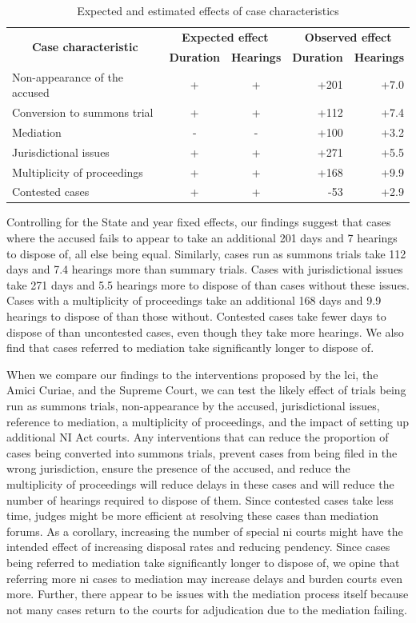 \documentclass[12pt,a4paper]{article}
\begin{document}
\begin{table}[!ht]
\caption{Expected and estimated effects of case characteristics}
\label{tab:observed}
\centering
\footnotesize
\begin{tabular}{lcc|rr}
\toprule
\multicolumn{1}{c}{\multirow{2}{*}{\textbf{Case characteristic}}} & \multicolumn{2}{c}{\textbf{Expected effect}} & \multicolumn{2}{c}{\textbf{Observed effect}} \\ \cmidrule(l){2-5}
\multicolumn{1}{c}{} & \textbf{Duration} & \textbf{Hearings} & \textbf{Duration} & \textbf{Hearings}\\ \midrule
Non-appearance of the accused & + & + & +201 & +7.0 \\
Conversion to summons trial & + & + & +112 & +7.4\\
Mediation & - & - & +100 & +3.2 \\
Jurisdictional issues & + & + & +271 & +5.5 \\
Multiplicity of proceedings & + & + & +168 & +9.9\\
Contested cases & + & + & -53 & +2.9\\ \bottomrule
\end{tabular}
\end{table}

Controlling for the State and year fixed effects, our findings suggest that cases where the accused fails to appear to take an additional 201 days and 7 hearings to dispose of, all else being equal. Similarly, cases run as summons trials take 112 days and 7.4 hearings more than summary trials. Cases with jurisdictional issues take 271 days and 5.5 hearings more to dispose of than cases without these issues. Cases with a multiplicity of proceedings take an additional 168 days and 9.9 hearings to dispose of than those without. Contested cases take fewer days to dispose of than uncontested cases, even though they take more hearings. We also find that cases referred to mediation take significantly longer to dispose of.

When we compare our findings to the interventions proposed by the \gls{lci}, the Amici Curiae, and the Supreme Court, we can test the likely effect of trials being run as summons trials, non-appearance by the accused, jurisdictional issues, reference to mediation, a multiplicity of proceedings, and the impact of setting up additional NI Act courts. Any interventions that can reduce the proportion of cases being converted into summons trials, prevent cases from being filed in the wrong jurisdiction, ensure the presence of the accused, and reduce the multiplicity of proceedings will reduce delays in these cases and will reduce the number of hearings required to dispose of them. Since contested cases take less time, judges might be more efficient at resolving these cases than mediation forums. As a corollary, increasing the number of special \gls{ni} courts might have the intended effect of increasing disposal rates and reducing pendency. Since cases being referred to mediation take significantly longer to dispose of, we opine that referring more \gls{ni} cases to mediation may increase delays and burden courts even more. Further, there appear to be issues with the mediation process itself because not many cases return to the courts for adjudication due to the mediation failing.
\end{document}
